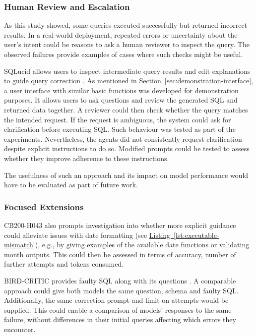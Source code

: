 \subsubsection{Human Review and Escalation}

As this study showed, some queries executed successfully but returned incorrect results.
In a real-world deployment, repeated errors or uncertainty about the user's intent
could be reasons to ask a human reviewer to inspect the query.
The observed failures provide examples of cases where such checks might be useful.

SQLucid allows users to inspect intermediate query results and edit explanations
to guide query correction \citep{tian2024sqlucid}.
As mentioned in \hyperref[sec:demonstration-interface]{Section~\ref*{sec:demonstration-interface}},
a user interface with similar basic functions was developed for demonstration purposes.
It allows users to ask questions and review the generated SQL and returned data together.
A reviewer could then check whether the query matches the intended request.
If the request is ambiguous, the system could ask for clarification before executing SQL.
Such behaviour was tested as part of the experiments.
Nevertheless, the agents did not consistently request clarification
despite explicit instructions to do so.
Modified prompts could be tested to assess whether they improve adherence
to these instructions.

The usefulness of such an approach and its impact on model performance
would have to be evaluated as part of future work.

\subsubsection{Focused Extensions}

CB200-H043 also prompts investigation into whether more explicit guidance could alleviate issues with date formatting 
(see \hyperref[lst:executable-mismatch]{Listing~\ref*{lst:executable-mismatch}}), 
e.g., by giving examples of the available date functions or validating month outputs. 
This could then be assessed in terms of accuracy, number of further attempts and tokens consumed.

BIRD-CRITIC provides faulty SQL along with its questions \citep{li2025swesql}. 
A comparable approach could give both models the same question, schema and faulty SQL. 
Additionally, the same correction prompt and limit on attempts would be supplied. 
This could enable a comparison of models' responses to the same failure, 
without differences in their initial queries affecting which errors they encounter.

